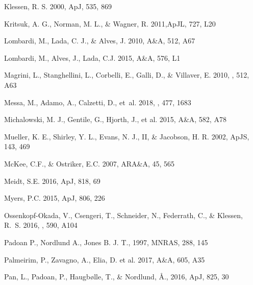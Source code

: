 \documentclass{aa}
\begin{document}
\begin{thebibliography}{}
 Klessen, R. S. 2000, ApJ, 535, 869

 Kritsuk, A. G., Norman, M. L., \& Wagner, R.
    2011,ApJL, 727, L20

 Lombardi, M., Lada, C. J., \&
    Alves, J. 2010, A\&A, 512, A67

 Lombardi, M., Alves, J., Lada, C.J.
    2015, A\&A, 576, L1

{Magrini}, L., {Stanghellini}, L., {Corbelli}, E., {Galli}, D., \& {Villaver},
  E. 2010, \aap, 512, A63

{Messa}, M., {Adamo}, A., {Calzetti}, D., {et~al.} 2018, \mnras, 477, 1683

 Michalowski, M. J., Gentile, G.,
    Hjorth, J., et al. 2015, A\&A, 582, A78

  Mueller, K. E., Shirley, Y. L., Evans, N.
    J., II, \& Jacobson, H. R. 2002, ApJS, 143, 469

 McKee, C.F., \&
    Ostriker, E.C. 2007, ARA\&A, 45, 565

 Meidt, S.E. 2016, ApJ, 818, 69

 Myers, P.C. 2015, ApJ, 806, 226

{Ossenkopf-Okada}, V., {Csengeri}, T., {Schneider}, N., {Federrath}, C., \&
  {Klessen}, R.~S. 2016, \aap, 590, A104

 Padoan P., Nordlund A., Jones B. J.
    T., 1997, MNRAS, 288, 145

 Palmeirim, P., Zavagno, A., Elia, D. et
    al. 2017, A\&A, 605, A35

 Pan, L., Padoan, P., Haugb\o lle, T., \&
    Nordlund, \AA., 2016, ApJ, 825, 30


\end{thebibliography}
\end{document}

